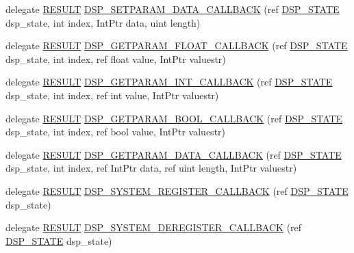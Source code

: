 \begin{DoxyCompactItemize}
\item 
delegate \hyperlink{namespace_f_m_o_d_a305d1176ef3f8c8815861a60407ac33d}{R\+E\+S\+U\+LT} \hyperlink{namespace_f_m_o_d_ae45105ca8a1ef96972de8df39686dd37}{D\+S\+P\+\_\+\+S\+E\+T\+P\+A\+R\+A\+M\+\_\+\+D\+A\+T\+A\+\_\+\+C\+A\+L\+L\+B\+A\+CK} (ref \hyperlink{struct_f_m_o_d_1_1_d_s_p___s_t_a_t_e}{D\+S\+P\+\_\+\+S\+T\+A\+TE} dsp\+\_\+state, int index, Int\+Ptr data, uint length)
\item 
delegate \hyperlink{namespace_f_m_o_d_a305d1176ef3f8c8815861a60407ac33d}{R\+E\+S\+U\+LT} \hyperlink{namespace_f_m_o_d_a4130b86a5e4abbffff836107fab70e65}{D\+S\+P\+\_\+\+G\+E\+T\+P\+A\+R\+A\+M\+\_\+\+F\+L\+O\+A\+T\+\_\+\+C\+A\+L\+L\+B\+A\+CK} (ref \hyperlink{struct_f_m_o_d_1_1_d_s_p___s_t_a_t_e}{D\+S\+P\+\_\+\+S\+T\+A\+TE} dsp\+\_\+state, int index, ref float value, Int\+Ptr valuestr)
\item 
delegate \hyperlink{namespace_f_m_o_d_a305d1176ef3f8c8815861a60407ac33d}{R\+E\+S\+U\+LT} \hyperlink{namespace_f_m_o_d_a9dd6fc9cca0cf8aa18cd9a631f901247}{D\+S\+P\+\_\+\+G\+E\+T\+P\+A\+R\+A\+M\+\_\+\+I\+N\+T\+\_\+\+C\+A\+L\+L\+B\+A\+CK} (ref \hyperlink{struct_f_m_o_d_1_1_d_s_p___s_t_a_t_e}{D\+S\+P\+\_\+\+S\+T\+A\+TE} dsp\+\_\+state, int index, ref int value, Int\+Ptr valuestr)
\item 
delegate \hyperlink{namespace_f_m_o_d_a305d1176ef3f8c8815861a60407ac33d}{R\+E\+S\+U\+LT} \hyperlink{namespace_f_m_o_d_a33838e3f6ccd4391d489471a6c8f6759}{D\+S\+P\+\_\+\+G\+E\+T\+P\+A\+R\+A\+M\+\_\+\+B\+O\+O\+L\+\_\+\+C\+A\+L\+L\+B\+A\+CK} (ref \hyperlink{struct_f_m_o_d_1_1_d_s_p___s_t_a_t_e}{D\+S\+P\+\_\+\+S\+T\+A\+TE} dsp\+\_\+state, int index, ref bool value, Int\+Ptr valuestr)
\item 
delegate \hyperlink{namespace_f_m_o_d_a305d1176ef3f8c8815861a60407ac33d}{R\+E\+S\+U\+LT} \hyperlink{namespace_f_m_o_d_a2c3e74855c682c2e23061f6a5e45cab0}{D\+S\+P\+\_\+\+G\+E\+T\+P\+A\+R\+A\+M\+\_\+\+D\+A\+T\+A\+\_\+\+C\+A\+L\+L\+B\+A\+CK} (ref \hyperlink{struct_f_m_o_d_1_1_d_s_p___s_t_a_t_e}{D\+S\+P\+\_\+\+S\+T\+A\+TE} dsp\+\_\+state, int index, ref Int\+Ptr data, ref uint length, Int\+Ptr valuestr)
\item 
delegate \hyperlink{namespace_f_m_o_d_a305d1176ef3f8c8815861a60407ac33d}{R\+E\+S\+U\+LT} \hyperlink{namespace_f_m_o_d_a4457427eed494a3d957f3d99d9639ef1}{D\+S\+P\+\_\+\+S\+Y\+S\+T\+E\+M\+\_\+\+R\+E\+G\+I\+S\+T\+E\+R\+\_\+\+C\+A\+L\+L\+B\+A\+CK} (ref \hyperlink{struct_f_m_o_d_1_1_d_s_p___s_t_a_t_e}{D\+S\+P\+\_\+\+S\+T\+A\+TE} dsp\+\_\+state)
\item 
delegate \hyperlink{namespace_f_m_o_d_a305d1176ef3f8c8815861a60407ac33d}{R\+E\+S\+U\+LT} \hyperlink{namespace_f_m_o_d_a39b15dd04002fdbc990ceeedc0a86080}{D\+S\+P\+\_\+\+S\+Y\+S\+T\+E\+M\+\_\+\+D\+E\+R\+E\+G\+I\+S\+T\+E\+R\+\_\+\+C\+A\+L\+L\+B\+A\+CK} (ref \hyperlink{struct_f_m_o_d_1_1_d_s_p___s_t_a_t_e}{D\+S\+P\+\_\+\+S\+T\+A\+TE} dsp\+\_\+state)

\end{DoxyCompactItemize}
